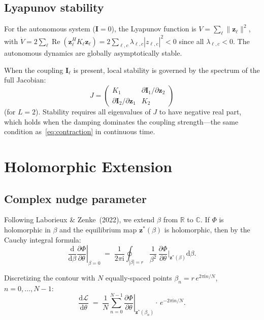 \documentclass[11pt]{article}
\newcommand{\R}{\mathbb{R}}
\newcommand{\C}{\mathbb{C}}
\newcommand{\im}{\mathrm{i}}
\newcommand{\dd}{\mathrm{d}}
\theoremstyle{definition}
\DeclareMathOperator{\Real}{Re}
\begin{document}
\subsection{Lyapunov stability}

For the autonomous system ($\bm{I}=0$), the Lyapunov function is
$V = \sum_\ell \|\bm{z}_\ell\|^2$, with
$\dot{V} = 2\sum_\ell\Real(\bm{z}_\ell^H K_\ell\bm{z}_\ell)
= 2\sum_{\ell,c}\lambda_{\ell,c}|z_{\ell,c}|^2 < 0$
since all $\lambda_{\ell,c}<0$.  The autonomous dynamics are globally
asymptotically stable.

When the coupling $\bm{I}_\ell$ is present, local stability is
governed by the spectrum of the full Jacobian:
\[
  J = \begin{pmatrix}
    K_1 & \partial\bm{I}_1/\partial\bm{z}_2 \\
    \partial\bm{I}_2/\partial\bm{z}_1 & K_2
  \end{pmatrix}
\]
(for $L=2$).  Stability requires all eigenvalues of $J$ to have
negative real part, which holds when the damping dominates the
coupling strength---the same condition as~\eqref{eq:contraction}
in continuous time.

\section{Holomorphic Extension}\label{sec:holo}

\subsection{Complex nudge parameter}

Following Laborieux \& Zenke~(2022), we extend $\beta$ from
$\R$ to $\C$.  If $\Phi$ is holomorphic in $\beta$ and
the equilibrium map $\bm{z}^*(\beta)$ is holomorphic, then
by the Cauchy integral formula:
\begin{equation}\label{eq:cauchy}
  \left.\frac{\dd}{\dd\beta}
    \frac{\partial\Phi}{\partial\theta}\right|_{\beta=0}
  \;=\;
  \frac{1}{2\pi\im}
  \oint_{|\beta|=r}
    \frac{1}{\beta^2}\,
    \frac{\partial\Phi}{\partial\theta}\bigg|_{\bm{z}^*(\beta)}
    \dd\beta.
\end{equation}

Discretizing the contour with $N$ equally-spaced points
$\beta_n = r\,e^{2\pi\im n/N}$, $n=0,\dots,N-1$:
\begin{equation}\label{eq:fourier}
  \boxed{
  \frac{\dd\mathcal{L}}{\dd\theta}
  \;=\;
  \frac{1}{N}\sum_{n=0}^{N-1}
    \left.\frac{\partial\Phi}{\partial\theta}\right|_{\bm{z}^*(\beta_n)}
    \!\!\cdot\, e^{-2\pi\im n/N}.
  }
\end{equation}
\end{document}
